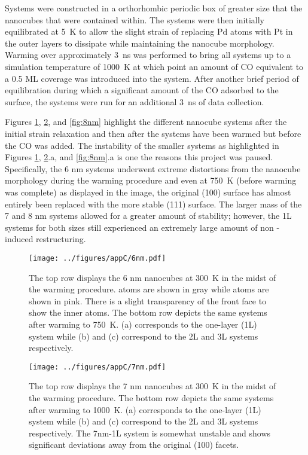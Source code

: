 Systems were constructed in a orthorhombic periodic box of greater size that
the nanocubes that were contained within. The systems were then initially
equilibrated at 5~K to allow the slight strain of replacing Pd atoms with Pt in
the outer layers to dissipate while maintaining the nanocube morphology.
Warming over approximately 3~ns was performed to bring all systems up to a
simulation temperature of 1000~K at which point an amount of CO equivalent to a
0.5 ML coverage was introduced into the system.  After another brief period of
equilibration during which a significant amount of the CO adsorbed to the
surface, the systems were run for an additional 3~ns of
data collection.

Figures \ref{fig:6nm}, \ref{fig:7nm}, and \ref{fig:8nm} highlight the different
nanocube systems after the initial strain relaxation and then after the systems
have been warmed but before the CO was added. The instability of the smaller
systems as highlighted in Figures \ref{fig:6nm}, \ref{fig:7nm}.a, and
\ref{fig:8nm}.a is one the reasons this project was paused.  Specifically, the
6 nm systems underwent extreme distortions from the nanocube morphology during
the warming procedure and even at 750~K (before warming was complete) as
displayed in the image, the original (100) surface has almost entirely been
replaced with the more stable (111) surface. The larger mass of the 7 and 8 nm
systems allowed for a greater amount of stability; however, the 1L systems for
both sizes still experienced an extremely large amount of non -induced
restructuring.

\begin{landscape}
\begin{figure}[p!]
\centering
  \texttt{[image: ../figures/appC/6nm.pdf]}
  \caption{The top row displays the 6 nm nanocubes at 300~K in the midst of the
warming procedure.   atoms are shown in gray while  atoms are
shown in pink.  There is a slight transparency of the front  face to
show the inner  atoms. The bottom row depicts the same systems after
warming to 750~K.  (a) corresponds to the one-layer (1L) system while (b) and
(c) correspond to the 2L and 3L systems respectively.}
  \label{fig:6nm}
\end{figure}
\end{landscape}

\begin{landscape}
\begin{figure}[p!]
\centering
  \texttt{[image: ../figures/appC/7nm.pdf]}
  \caption{The top row displays the 7 nm nanocubes at 300~K in the midst of the warming procedure.
The bottom row depicts the same systems after warming to
1000~K.  (a) corresponds to the one-layer (1L) system while (b) and (c)
correspond to the 2L and 3L systems respectively. The 7nm-1L system is somewhat
unstable and shows significant deviations away from the original (100) facets.}
  \label{fig:7nm}
\end{figure}
\end{landscape}

